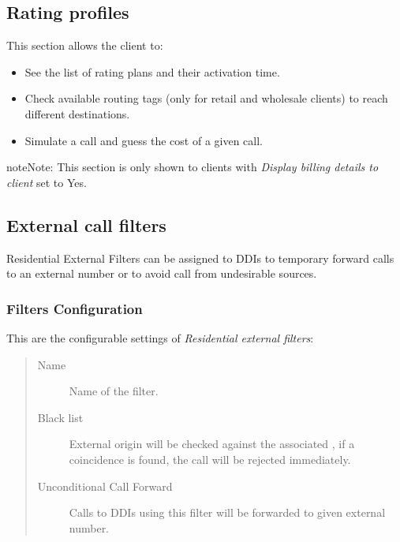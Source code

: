 \documentclass[letterpaper,10pt,english]{sphinxmanual}
\begin{document}
\subsection{Rating profiles}
\label{administration_portal/client/residential/rating_profiles:rating-profiles}\label{administration_portal/client/residential/rating_profiles::doc}
This section allows the client to:
\begin{itemize}
\item {} 
See the list of rating plans and their activation time.

\item {} 
Check available routing tags (only for retail and wholesale clients) to reach different destinations.

\item {} 
Simulate a call and guess the cost of a given call.

\end{itemize}

\begin{notice}{note}{Note:}
This section is only shown to clients with \emph{Display billing details to client} set to Yes.
\end{notice}


\subsection{External call filters}
\label{administration_portal/client/residential/external_call_filters:external-call-filters}\label{administration_portal/client/residential/external_call_filters:residential-filters}\label{administration_portal/client/residential/external_call_filters::doc}
Residential External Filters can be assigned to DDIs to temporary
forward calls to an external number or to avoid call from undesirable sources.


\subsubsection{Filters Configuration}
\label{administration_portal/client/residential/external_call_filters:filters-configuration}
This are the configurable settings of \emph{Residential external filters}:
\begin{quote}
\begin{description}
\item[{Name}] \leavevmode
Name of the filter.

\item[{Black list}] \leavevmode
External origin will be checked against the associated {\hyperref[administration_portal/client/vpbx/routing_tools/match_lists:match\string-lists]{}},
if a coincidence is found, the call will be rejected immediately.

\item[{Unconditional Call Forward}] \leavevmode
Calls to DDIs using this filter will be forwarded to given external number.

\end{description}
\end{quote}
\end{document}
